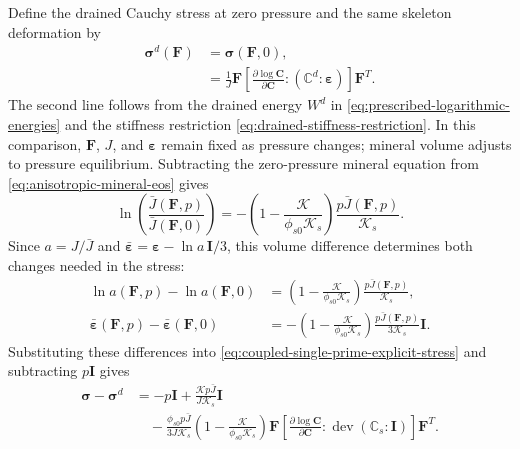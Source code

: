 \documentclass[11pt]{article}
\newcommand{\dev}{\operatorname{dev}}
\newcommand{\pder}[2]{\frac{\partial #1}{\partial #2}}
\begin{document}
Define the drained Cauchy stress at zero pressure and the same skeleton
deformation by
\begin{align}
 \mathbf\sigma^d(\mathbf F)&=\mathbf\sigma(\mathbf F,0),
 \label{eq:finite-drained-stress-definition}\\
 &=\frac1J\mathbf F
 \left[\pder{\log\mathbf C}{\mathbf C}:
             (\mathbb{C}^d:\mathbf\varepsilon)\right]\mathbf F^T.
 \label{eq:finite-drained-stress-energy-law}
\end{align}
The second line follows from the drained energy \(W^d\) in
\eqref{eq:prescribed-logarithmic-energies} and the stiffness restriction
\eqref{eq:drained-stiffness-restriction}. In this comparison,
\(\mathbf F\), \(J\), and \(\mathbf\varepsilon\) remain fixed as
pressure changes; mineral volume adjusts to pressure equilibrium.
Subtracting the zero-pressure mineral equation from
\eqref{eq:anisotropic-mineral-eos} gives
\begin{equation}
 \ln\left(\frac{\bar J(\mathbf F,p)}{\bar J(\mathbf F,0)}\right)
 =-\left(1-\frac{\mathcal{K}}{\phi_{s0}\mathcal{K}_s}\right)\frac{p\bar J(\mathbf F,p)}{\mathcal{K}_s}.
 \label{eq:finite-pressure-mineral-volume-difference}
\end{equation}
Since \(a=J/\bar J\) and
\(\bar{\mathbf\varepsilon}=\mathbf\varepsilon-\ln a\,\mathbf I/3\),
this volume difference determines both changes needed in the stress:
\begin{align}
 \ln a(\mathbf F,p)-\ln a(\mathbf F,0)
 &=\left(1-\frac{\mathcal{K}}{\phi_{s0}\mathcal{K}_s}\right)\frac{p\bar J(\mathbf F,p)}{\mathcal{K}_s},
 \label{eq:finite-pressure-distention-difference}\\
 \bar{\mathbf\varepsilon}(\mathbf F,p)
       -\bar{\mathbf\varepsilon}(\mathbf F,0)
 &=-\left(1-\frac{\mathcal{K}}{\phi_{s0}\mathcal{K}_s}\right)\frac{p\bar J(\mathbf F,p)}{3\mathcal{K}_s}\mathbf I.
 \label{eq:finite-pressure-mineral-strain-difference}
\end{align}
Substituting these differences into
\eqref{eq:coupled-single-prime-explicit-stress} and subtracting
\(p\mathbf I\) gives
\begin{align}
 \mathbf\sigma-\mathbf\sigma^d
 &=-p\mathbf I+\frac{\mathcal{K}p\bar J}{J\mathcal{K}_s}\mathbf I
 \nonumber\\
 &\quad-\frac{\phi_{s0}p\bar J}{3J\mathcal{K}_s}\left(1-\frac{\mathcal{K}}{\phi_{s0}\mathcal{K}_s}\right)\mathbf F
 \left[\pder{\log\mathbf C}{\mathbf C}:
                \dev(\mathbb{C}_s:\mathbf I)\right]\mathbf F^T.
 \label{eq:finite-pressure-stress-difference}
\end{align}
\end{document}
